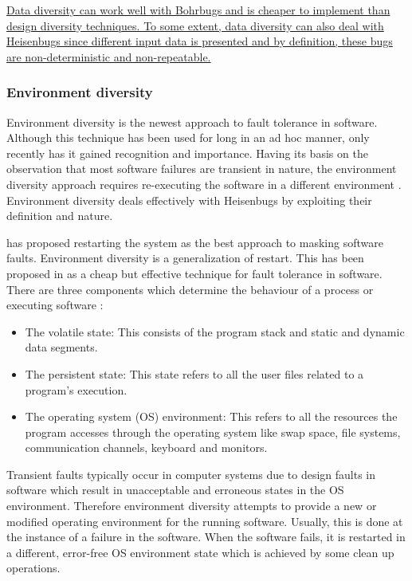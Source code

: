 \documentclass[a4paper, 11pt]{article}
\begin{document}
\ul{Data diversity can work well with Bohrbugs and is cheaper to implement than design diversity techniques. To some extent, data diversity can also deal with Heisenbugs since different input data is presented and by definition, these bugs are non-deterministic and non-repeatable.}

\subsubsection{Environment diversity}
Environment diversity is the newest approach to fault tolerance in software. Although this technique has been used for long in an ad hoc manner, only recently has it gained recognition and importance. Having its basis on the observation that most software failures are transient in nature, the environment diversity approach requires re-executing the software in a different environment \citep{jalote1995framework}. Environment diversity deals effectively with Heisenbugs by exploiting their definition and nature.

\citet{adams1984optimizing} has proposed restarting the system as the best approach to masking software faults. Environment diversity is a generalization of restart. This has been proposed in \citep{huang1994two,jalote1995framework} as a cheap but effective technique for fault tolerance in software. There are three components which determine the behaviour of a process or executing software \citep{wang1995checkpointing}:

\begin{itemize}
\item The volatile state: This consists of the program stack and static and dynamic data segments.
\item The persistent state: This state refers to all the user files related to a program's execution.
\item The operating system (OS) environment: This refers to all the resources the program accesses through the operating system like swap space, file systems, communication channels, keyboard and monitors.
\end{itemize}

Transient faults typically occur in computer systems due to design faults in software which result in unacceptable and erroneous states in the OS environment. Therefore environment diversity attempts to provide a new or modified operating environment for the running software. Usually, this is done at the instance of a failure in the software. When the software fails, it is restarted in a different, error-free OS environment state which is achieved by some clean up operations.
\end{document}
